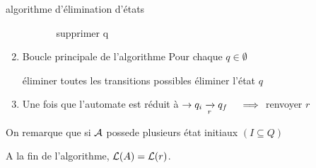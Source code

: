\documentclass[a4paper,french,bookmarks]{book}
\begin{document}
\begin{definition}{algorithme d'élimination d'états}{}
\begin{enumerate}
\begin{enumerate}
\begin{enumerate}
                        \itt supprimer q 
                    \end{enumerate}
                \end{enumerate}
            
            \item Boucle principale de l'algorithme 
                Pour chaque $q \in \emptyset$ 
                \begin{enumerate}
                    \itt éliminer toutes les transitions possibles
                    \itt éliminer l'état $q$
                \end{enumerate}
            \item Une fois que l'automate est réduit à $\to q_i \lima{r}{} q_f \quad \implies$ renvoyer $r$
        \end{enumerate}
    \end{definition}
    
    On remarque que si $\mathcal{A}$ possede plusieurs état initiaux $(I \subseteq Q)$
    
    \begin{theorem}{}{}
        A la fin de l'algorithme, $\mathcal{L}\!\left(A\right) = \mathcal{L}\!\left(r\right)$.
    \end{theorem}
    
\end{document}
